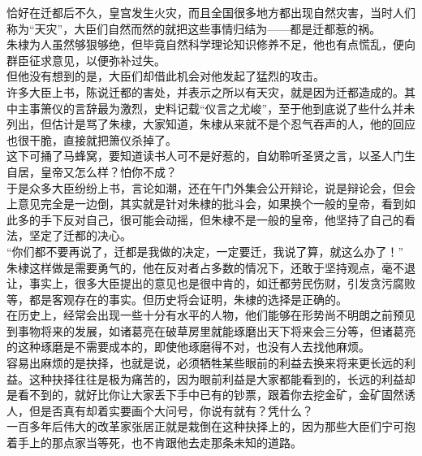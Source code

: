 \begin{multicols}{\theparacolNo}
恰好在迁都后不久，皇宫发生火灾，而且全国很多地方都出现自然灾害，当时人们称为“天灾”，大臣们自然而然的就把这些事情归结为——都是迁都惹的祸。\\

朱棣为人虽然够狠够绝，但毕竟自然科学理论知识修养不足，他也有点慌乱，便向群臣征求意见，以便弥补过失。\\

但他没有想到的是，大臣们却借此机会对他发起了猛烈的攻击。\\

许多大臣上书，陈说迁都的害处，并表示之所以有天灾，就是因为迁都造成的。其中主事箫仪的言辞最为激烈，史料记载“仪言之尤峻”，至于他到底说了些什么并未列出，但估计是骂了朱棣，大家知道，朱棣从来就不是个忍气吞声的人，他的回应也很干脆，直接就把箫仪杀掉了。\\

这下可捅了马蜂窝，要知道读书人可不是好惹的，自幼聆听圣贤之言，以圣人门生自居，皇帝又怎么样？怕你不成？\\

于是众多大臣纷纷上书，言论如潮，还在午门外集会公开辩论，说是辩论会，但会上意见完全是一边倒，其实就是针对朱棣的批斗会，如果换个一般的皇帝，看到如此多的手下反对自己，很可能会动摇，但朱棣不是一般的皇帝，他坚持了自己的看法，坚定了迁都的决心。\\

“你们都不要再说了，迁都是我做的决定，一定要迁，我说了算，就这么办了！”\\

朱棣这样做是需要勇气的，他在反对者占多数的情况下，还敢于坚持观点，毫不退让，事实上，很多大臣提出的意见也是很中肯的，如迁都劳民伤财，引发贪污腐败等，都是客观存在的事实。但历史将会证明，朱棣的选择是正确的。\\

在历史上，经常会出现一些十分有水平的人物，他们能够在形势尚不明朗之前预见到事物将来的发展，如诸葛亮在破草房里就能琢磨出天下将来会三分等，但诸葛亮的这种琢磨是不需要成本的，即使他琢磨得不对，也没有人去找他麻烦。\\

容易出麻烦的是抉择，也就是说，必须牺牲某些眼前的利益去换来将来更长远的利益。这种抉择往往是极为痛苦的，因为眼前利益是大家都能看到的，长远的利益却是看不到的，就好比你让大家丢下手中已有的钞票，跟着你去挖金矿，金矿固然诱人，但是否真有却着实要画个大问号，你说有就有？凭什么？\\

一百多年后伟大的改革家张居正就是栽倒在这种抉择上的，因为那些大臣们宁可抱着手上的那点家当等死，也不肯跟他去走那条未知的道路。\\


\end{multicols}
